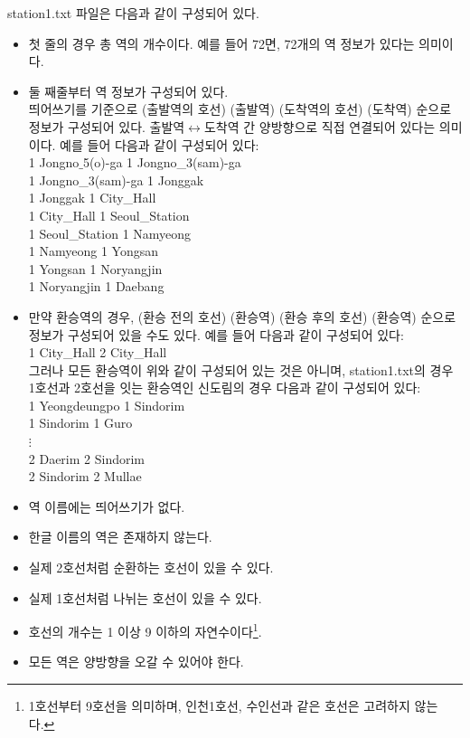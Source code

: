 \documentclass{article}
\begin{document}
station1.txt 파일은 다음과 같이 구성되어 있다.
\begin{itemize}
    \item 첫 줄의 경우 총 역의 개수이다. 예를 들어 72면, 72개의 역 정보가 있다는 의미이다.
    \item 둘 째줄부터 역 정보가 구성되어 있다.\\
    띄어쓰기를 기준으로 (출발역의 호선) (출발역) (도착역의 호선) (도착역) 순으로 정보가 구성되어 있다. 출발역$\longleftrightarrow$도착역 간 양방향으로 직접 연결되어 있다는 의미이다. 예를 들어 다음과 같이 구성되어 있다: \\
    1 Jongno$\_$5(o)-ga 1 Jongno\_3(sam)-ga \\
    1 Jongno\_3(sam)-ga 1 Jonggak \\
    1 Jonggak 1 City\_Hall \\
    1 City\_Hall 1 Seoul\_Station\\
    1 Seoul\_Station 1 Namyeong\\
    1 Namyeong 1 Yongsan\\
    1 Yongsan 1 Noryangjin\\
    1 Noryangjin 1 Daebang
    
    \item 만약 환승역의 경우, (환승 전의 호선) (환승역) (환승 후의 호선) (환승역) 순으로 정보가 구성되어 있을 수도 있다. 예를 들어 다음과 같이 구성되어 있다:\\
    1 City\_Hall 2 City\_Hall\\
    그러나 모든 환승역이 위와 같이 구성되어 있는 것은 아니며, station1.txt의 경우 1호선과 2호선을 잇는 환승역인 신도림의 경우 다음과 같이 구성되어 있다:\\
    1 Yeongdeungpo 1 Sindorim \\
    1 Sindorim 1 Guro \\
    $\vdots$ \\
    2 Daerim 2 Sindorim\\
    2 Sindorim 2 Mullae
    
    \item 역 이름에는 띄어쓰기가 없다. 
    \item 한글 이름의 역은 존재하지 않는다.
    \item 실제 2호선처럼 순환하는 호선이 있을 수 있다.
    \item 실제 1호선처럼 나뉘는 호선이 있을 수 있다.
    \item 호선의 개수는 1 이상 9 이하의 자연수이다\footnote{1호선부터 9호선을 의미하며, 인천1호선, 수인선과 같은 호선은 고려하지 않는다.}.
    \item 모든 역은 양방향을 오갈 수 있어야 한다.
\end{itemize}
\end{document}
